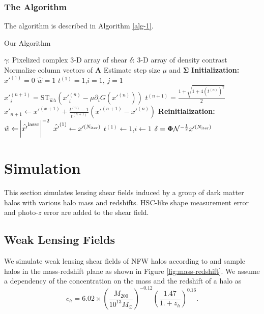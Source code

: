 \documentclass[twocolumn]{aastex62}
\begin{document}
\subsubsection{The Algorithm}
The algorithm is described in Algorithm \ref{alg-1}.

\begin{algorithm}[H]
\renewcommand{\thealgorithm}{}
\label{alg-1}
\caption{Our Algorithm}
\begin{algorithmic}[1]
\INPUT $\gamma$: Pixelized complex $3$-D array of shear
\OUTPUT  $\delta$: $3$-D array of density contrast
\STATE Normalize column vectors of $\mathbf{A}$
\STATE Estimate step size $\mu$ and $\mathbf{\Sigma}$
\STATE \textbf{Initialization:} ‎
\STATE $x'^{(1)} = 0$ 
\STATE $\hat{w}=1$
\STATE $t^{(1)}=1$,$i=1$, $j=1$
        \STATE $x'^{(n+1)}_{i}=\mathrm{ST}_{\hat{w}\lambda} \left(x'^{(n)}_{i} -\mu \partial_i G(x'^{(n)})\right)$
        \STATE $t^{(n+1)}=\frac{1+\sqrt{1+4(t^{(n)})^2}}{2}$
        \STATE $x'_{n+1} \leftarrow x'^{(x+1)}+ \frac{t^{(n)}-1}{t^{(n+1)}}(x'^{(n+1)}-x'^{(n)})$
    \ENDWHILE
\STATE \textbf{Reinitialization:} ‎
\STATE $\hat{w}\leftarrow \abs{\hat{x'}^{\rm{lasso}}}^{-2}$
\STATE $\hat{x'}^{(1)} \leftarrow x'^{(N_{\rm{iter}})}$
\STATE $t^{(1)}\leftarrow1$,$i\leftarrow1$
\ENDWHILE
\STATE $\delta=\mathbf{\Phi}\mathcal{N}^{-\frac{1}{2}}x'^{(N_{\rm{iter}})}$
\end{algorithmic}
\end{algorithm}


\section{Simulation}
\label{sec:Sim}
This section simulates lensing shear fields induced by a group of dark matter halos with various halo mass and redshifts.
HSC-like shape measurement error and photo-$z$ error are added to the shear field.

\subsection{Weak Lensing Fields}

We simulate weak lensing shear fields of NFW halos according to \citet{haloModel-TJ2003-3pt}
and sample halos in the mass-redshift plane as shown in Figure \ref{fig:mass-redshift}.
We assume a dependency of the concentration on the mass and the redshift of a halo as \citep{c-M_Magneticum-Ragagnin2019}
\begin{equation}
c_{h}=6.02\times(\frac{M_{200}}{10^{13} M_{\odot}})^{-0.12}(\frac{1.47}{1.+z_h})^{0.16}.
\end{equation}
\end{document}
